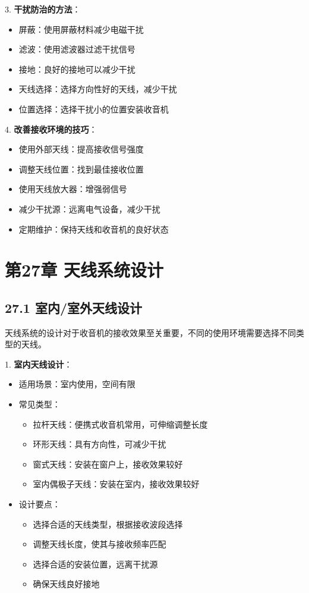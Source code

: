 \documentclass[12pt,UTF8]{ctexbook}
\begin{document}
3. \textbf{干扰防治的方法}：
   \begin{itemize}[leftmargin=3.5em]
   \item 屏蔽：使用屏蔽材料减少电磁干扰
   \item 滤波：使用滤波器过滤干扰信号
   \item 接地：良好的接地可以减少干扰
   \item 天线选择：选择方向性好的天线，减少干扰
   \item 位置选择：选择干扰小的位置安装收音机
   \end{itemize}

4. \textbf{改善接收环境的技巧}：
   \begin{itemize}[leftmargin=3.5em]
   \item 使用外部天线：提高接收信号强度
   \item 调整天线位置：找到最佳接收位置
   \item 使用天线放大器：增强弱信号
   \item 减少干扰源：远离电气设备，减少干扰
   \item 定期维护：保持天线和收音机的良好状态
   \end{itemize}

\chapter*{第27章 天线系统设计}
\section*{27.1 室内/室外天线设计}

天线系统的设计对于收音机的接收效果至关重要，不同的使用环境需要选择不同类型的天线。

1. \textbf{室内天线设计}：
   \begin{itemize}[leftmargin=3.5em]
   \item 适用场景：室内使用，空间有限
   \item 常见类型：
     \begin{itemize}
     \item 拉杆天线：便携式收音机常用，可伸缩调整长度
     \item 环形天线：具有方向性，可减少干扰
     \item 窗式天线：安装在窗户上，接收效果较好
     \item 室内偶极子天线：安装在室内，接收效果较好
     \end{itemize}
   \item 设计要点：
     \begin{itemize}
     \item 选择合适的天线类型，根据接收波段选择
     \item 调整天线长度，使其与接收频率匹配
     \item 选择合适的安装位置，远离干扰源
     \item 确保天线良好接地
     \end{itemize}
   \end{itemize}
\end{document}
